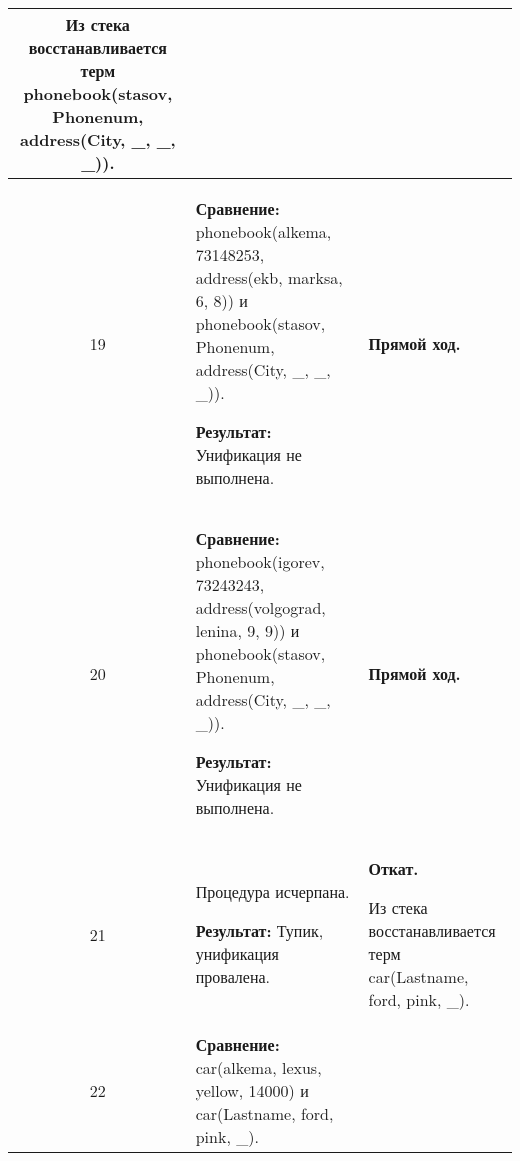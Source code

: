 \begin{longtable}{|c|p{}|p{}|}
    Из стека восстанавливается терм \newline
    phonebook(stasov, Phonenum, address(City, \_, \_, \_)).
                       \\ \hline

    19
                       &
\textbf{Сравнение:} \newline
  phonebook(alkema, 73148253,
            address(ekb,       marksa,       6,  8))
    \newline и \newline
    phonebook(stasov, Phonenum, address(City, \_, \_, \_)).
    \newline

    \textbf{Результат:} \newline
    Унификация не выполнена.
                       &
    \textbf{Прямой ход.}
                       \\ \hline

    20
                       &
\textbf{Сравнение:} \newline
  phonebook(igorev, 73243243,
            address(volgograd, lenina,       9,  9))
    \newline и \newline
    phonebook(stasov, Phonenum, address(City, \_, \_, \_)).
    \newline

    \textbf{Результат:} \newline
    Унификация не выполнена.
                       &
    \textbf{Прямой ход.}
                       \\ \hline

    21
                       &
    Процедура исчерпана.
    \newline

    \textbf{Результат:} \newline
    Тупик, унификация провалена.
                       &
    \textbf{Откат.}
    \newline

    Из стека восстанавливается терм \newline
    car(Lastname, ford, pink, \_).
                       \\ \hline

    22
                       &
\textbf{Сравнение:} \newline
  car(alkema, lexus,   yellow, 14000)
    \newline и \newline
    car(Lastname, ford, pink, \_).
    \newline


\end{longtable}
